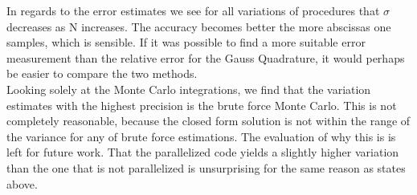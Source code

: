 \documentclass[%
reprint,nofootinbib,
amsmath,amssymb,
aps,
]{revtex4-1}
\begin{document}
In regards to the error estimates we see for all variations of procedures that $\sigma$ decreases as N increases. The accuracy becomes better the more abscissas one samples, which is sensible. If it was possible to find a more suitable error measurement than the relative error for the Gauss Quadrature, it would perhaps be easier to compare the two methods. \\ \indent 
Looking solely at the Monte Carlo integrations, we find that the variation estimates with the highest precision is the brute force Monte Carlo. This is not completely reasonable, because the closed form solution is not within the range of the variance for any of brute force estimations. The evaluation of why this is is left for future work. That the parallelized code yields a slightly higher variation than the one that is not parallelized is unsurprising for the same reason as states above. 
\newpage 
\end{document}
